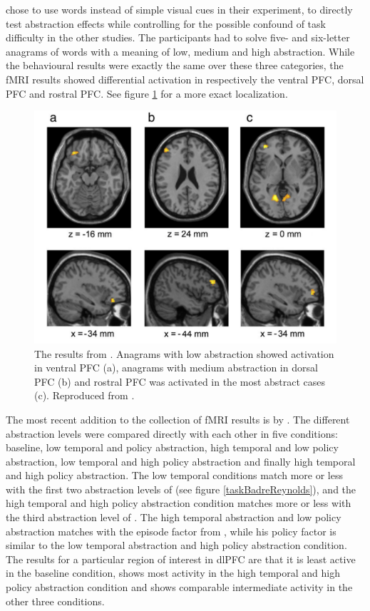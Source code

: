 \documentclass[10pt,a4paper]{report}
\begin{document}
\citet{Christoff2009} chose to use words instead of simple visual cues in their experiment, to directly test abstraction effects while controlling for the possible confound of task difficulty in the other studies. The participants had to solve five- and six-letter anagrams of words with a meaning of low, medium and high abstraction. While the behavioural results were exactly the same over these three categories, the fMRI results showed differential activation in respectively the ventral PFC, dorsal PFC and rostral PFC. See figure \ref{christoff} for a more exact localization.

\begin{figure}[bthp]
\begin{center}
\includegraphics[width=\textwidth]{figures/Christoff.png}
\caption{The results from \citet{Christoff2009}. Anagrams with low abstraction showed activation in ventral PFC (a), anagrams with medium abstraction in dorsal PFC (b) and rostral PFC was activated in the most abstract cases (c). Reproduced from \citet{Christoff2009}. }
\label{christoff}
\end{center}
\end{figure}

The most recent addition to the collection of fMRI results is by \citet*{Reynolds2012}. The different abstraction levels were compared directly with each other in five conditions: baseline, low temporal and policy abstraction, high temporal and low policy abstraction, low temporal and high policy abstraction and finally high temporal and high policy abstraction. The low temporal conditions match more or less with the first two abstraction levels of \citet{Badre2007} (see figure \ref{taskBadreReynolds}), and the high temporal and high policy abstraction condition matches more or less with the third abstraction level of \citet{Badre2007}. The high temporal abstraction and low policy abstraction matches with the episode factor from \citet{Koechlin2003}, while his policy factor is similar to the low temporal abstraction and high policy abstraction condition. The results for a particular region of interest in dlPFC are that it is least active in the baseline condition, shows most activity in the high temporal and high policy abstraction condition and shows comparable intermediate activity in the other three conditions.
\end{document}

